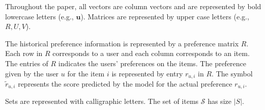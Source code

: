 Throughout the paper, all vectors are column vectors and are represented by
bold lowercase letters (e.g., $\bm{u}$). Matrices are represented by upper
case letters (e.g., ${R,U,V}$).

The historical preference information is represented by a preference matrix $R$.
Each row in ${R}$ corresponds to a user and each column corresponds to an item. 
The entries of $R$ indicates  the users' preferences on the items. 
The preference given by the user $u$ for the item $i$ is represented by entry $r_{u,i}$ in $R$.  
The symbol $\tilde{r}_{u,i}$ represents the score predicted by the model for the actual
preference $r_{u,i}$.

Sets are represented with calligraphic letters. The set of items $\mathcal{S}$
has size $|S|$.




